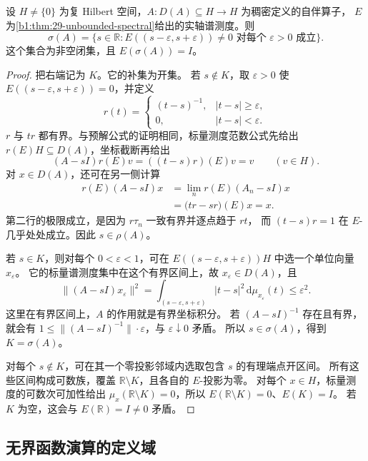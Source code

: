 \begin{proposition}[谱测度的支集与谱]
\label{b1:prop:29-unbounded-spectral-support}
设 \(H\ne\{0\}\) 为复 Hilbert 空间，\(A:D(A)\subseteq H\to H\) 为稠密定义的自伴算子，
\(E\) 为\cref{b1:thm:29-unbounded-spectral}给出的实轴谱测度。则
\[
 \sigma(A)=\{s\in\mathbb R:
 E((s-\varepsilon,s+\varepsilon))\ne0\text{ 对每个 }\varepsilon>0\text{ 成立}\}.
\]
这个集合为非空闭集，且 \(E(\sigma(A))=I\)。
\end{proposition}
\begin{proof}
把右端记为 \(K\)。它的补集为开集。
若 \(s\notin K\)，取 \(\varepsilon>0\) 使 \(E((s-\varepsilon,s+\varepsilon))=0\)，并定义
\[
 r(t)=
 \begin{cases}
  (t-s)^{-1},&|t-s|\ge\varepsilon,\\
  0,&|t-s|<\varepsilon.
 \end{cases}
\]
\(r\) 与 \(tr\) 都有界。与预解公式的证明相同，标量测度范数公式先给出
\(r(E)H\subseteq D(A)\)，坐标截断再给出
\[
 (A-sI)r(E)v=((t-s)r)(E)v=v\qquad(v\in H).
\]
对 \(x\in D(A)\)，还可在另一侧计算
\[
 \begin{aligned}
 r(E)(A-sI)x
 &=\lim_n r(E)(A_n-sI)x\\
 &=\bigl(tr-sr\bigr)(E)x=x.
 \end{aligned}
\]
第二行的极限成立，是因为 \(r\tau_n\) 一致有界并逐点趋于 \(rt\)，
而 \((t-s)r=1\) 在 \(E\)-几乎处处成立。因此 \(s\in\rho(A)\)。

若 \(s\in K\)，则对每个 \(0<\varepsilon<1\)，可在
\(E((s-\varepsilon,s+\varepsilon))H\) 中选一个单位向量 \(x_\varepsilon\)。
它的标量谱测度集中在这个有界区间上，故 \(x_\varepsilon\in D(A)\)，且
\[
 \|(A-sI)x_\varepsilon\|^2
 =\int_{(s-\varepsilon,s+\varepsilon)}|t-s|^2
          \,\mathrm d\mu_{x_\varepsilon}(t)
 \le\varepsilon^2.
\]
这里在有界区间上，\(A\) 的作用就是有界坐标积分。
若 \((A-sI)^{-1}\) 存在且有界，就会有
\(1\le\|(A-sI)^{-1}\|\cdot\varepsilon\)，与 \(\varepsilon\downarrow0\) 矛盾。
所以 \(s\in\sigma(A)\)，得到 \(K=\sigma(A)\)。

对每个 \(s\notin K\)，可在其一个零投影邻域内选取包含 \(s\) 的有理端点开区间。
所有这些区间构成可数族，覆盖 \(\mathbb R\setminus K\)，且各自的 \(E\)-投影为零。
对每个 \(x\in H\)，标量测度的可数次可加性给出
\(\mu_x(\mathbb R\setminus K)=0\)，所以 \(E(\mathbb R\setminus K)=0\)、\(E(K)=I\)。
若 \(K\) 为空，这会与 \(E(\mathbb R)=I\ne0\) 矛盾。
\end{proof}

\subsection{无界函数演算的定义域}
\label{b1:subsec:290603}


